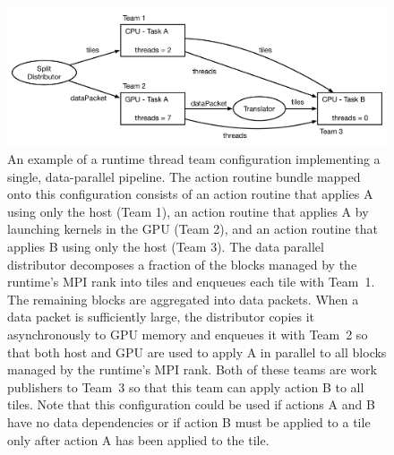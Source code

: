 \documentclass{article}
\begin{document}
\begin{figure}[!ht]
\begin{center}
\includegraphics[width=6.0in]{WorkSplittingExample.pdf}
\caption[]{An example of a runtime thread team configuration implementing a
single, data-parallel pipeline.  The action routine bundle
mapped onto this configuration consists of an action routine that applies A
using only the host (Team 1), an action routine that applies A by launching kernels in
the GPU (Team 2), and an action routine that applies B using only the host (Team 3).  The data
parallel distributor decomposes a fraction of the blocks managed by the
runtime's MPI rank into tiles and enqueues each tile with Team~1.  The remaining
blocks are aggregated into data packets.  When a data packet is sufficiently
large, the distributor copies it asynchronously to GPU memory and enqueues it
with Team~2 so that both host and GPU are used to apply A in parallel to all
blocks managed by the runtime's MPI rank.  Both of these teams are work
publishers to Team~3 so that this team can apply action B to all tiles.  Note
that this configuration could be used if actions A and B have no data
dependencies or if action B must be applied to a tile only after action A has
been applied to the tile.}
\label{fig:SplitItor}
\end{center}
\end{figure}
\end{document}
